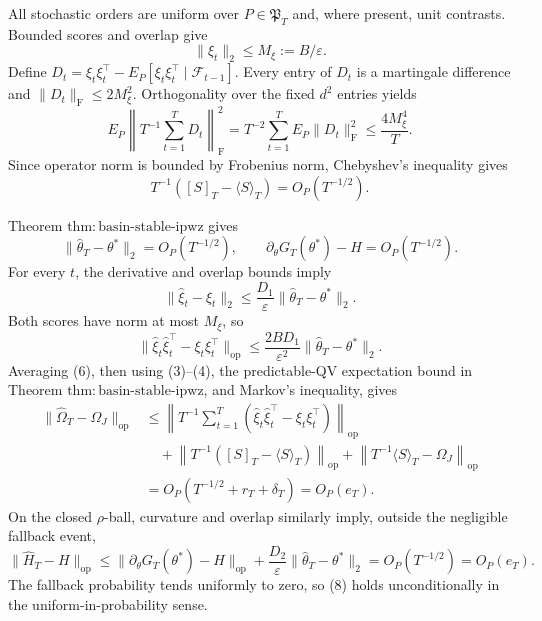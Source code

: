 All stochastic orders are uniform over \(P\in\mathfrak P_T\) and, where present, unit contrasts. Bounded scores and overlap give
\[
 \|\xi_t\|_2\le M_\xi:=B/\varepsilon.
\tag{1}
\]
Define \(D_t=\xi_t\xi_t^\top-E_P[\xi_t\xi_t^\top\mid\mathcal F_{t-1}]\). Every entry of \(D_t\) is a martingale difference and \(\|D_t\|_{\mathrm F}\le2M_\xi^2\). Orthogonality over the fixed \(d^2\) entries yields
\[
 E_P\left\|T^{-1}\sum_{t=1}^TD_t\right\|_{\mathrm F}^2
 =T^{-2}\sum_{t=1}^TE_P\|D_t\|_{\mathrm F}^2
 \le\frac{4M_\xi^4}{T}.
\tag{2}
\]
Since operator norm is bounded by Frobenius norm, Chebyshev's inequality gives
\[
 T^{-1}([S]_T-\langle S\rangle_T)=O_P(T^{-1/2}).
\tag{3}
\]

Theorem \(\mathrm{thm:basin\text{-}stable\text{-}ipwz}\) gives
\[
 \|\widehat\theta_T-\theta^*\|_2=O_P(T^{-1/2}),
 \qquad \partial_\theta G_T(\theta^*)-H=O_P(T^{-1/2}).
\tag{4}
\]
For every \(t\), the derivative and overlap bounds imply
\[
 \|\widehat\xi_t-\xi_t\|_2
 \le\frac{D_1}{\varepsilon}\|\widehat\theta_T-\theta^*\|_2.
\tag{5}
\]
Both scores have norm at most \(M_\xi\), so
\[
 \|\widehat\xi_t\widehat\xi_t^\top-\xi_t\xi_t^\top\|_{\mathrm{op}}
 \le\frac{2BD_1}{\varepsilon^2}\|\widehat\theta_T-\theta^*\|_2.
\tag{6}
\]
Averaging (6), then using (3)--(4), the predictable-QV expectation bound in Theorem \(\mathrm{thm:basin\text{-}stable\text{-}ipwz}\), and Markov's inequality, gives
\[
\begin{aligned}
 \|\widehat\Omega_T-\Omega_J\|_{\mathrm{op}}
 &\le\left\|T^{-1}\sum_{t=1}^T
 (\widehat\xi_t\widehat\xi_t^\top-\xi_t\xi_t^\top)\right\|_{\mathrm{op}}\\
 &\quad+\left\|T^{-1}([S]_T-\langle S\rangle_T)\right\|_{\mathrm{op}}
 +\left\|T^{-1}\langle S\rangle_T-\Omega_J\right\|_{\mathrm{op}}\\
 &=O_P(T^{-1/2}+r_T+\delta_T)=O_P(e_T).
\end{aligned}
\tag{7}
\]
On the closed \(\rho\)-ball, curvature and overlap similarly imply, outside the negligible fallback event,
\[
 \|\widehat H_T-H\|_{\mathrm{op}}
 \le\|\partial_\theta G_T(\theta^*)-H\|_{\mathrm{op}}
 +\frac{D_2}{\varepsilon}\|\widehat\theta_T-\theta^*\|_2
 =O_P(T^{-1/2})=O_P(e_T).
\tag{8}
\]
The fallback probability tends uniformly to zero, so (8) holds unconditionally in the uniform-in-probability sense.

